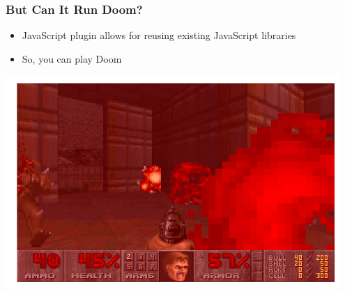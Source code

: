 \begin{frame}
  \frametitle{But Can It Run Doom?}
  \begin{itemize}
    \item JavaScript plugin allows for reusing existing JavaScript libraries
    \item So, you can play Doom
  \end{itemize}
\end{frame}

\begin{frame}
  \begin{center}
    \includegraphics[width=0.95\textwidth]{../../pics/doom.png}
  \end{center}
\end{frame}
